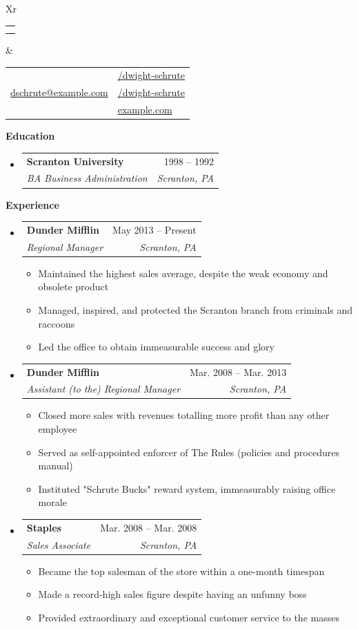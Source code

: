 \documentclass[letterpaper,12pt]{article}
\makeatletter
\def \fullname {Dwight Schrute}
\def \subtitle {}
\def \linkedinicon {\faLinkedin}
\def \linkedinlink {https://example.com/linkedin}
\def \linkedintext {/dwight-schrute}
\def \phoneicon {\faPhone}
\def \phonetext {+1-123-456-7890}
\def \emailicon {\faEnvelope}
\def \emaillink {mailto:dschrute@example.com}
\def \emailtext {dschrute@example.com}
\def \githubicon {\faGithub}
\def \githublink {https://example.com/github}
\def \githubtext {/dwight-schrute}
\def \websiteicon {\faGlobe}
\def \websitelink {https://example.com}
\def \websitetext {example.com}
\def \headertype {\doublecol} %
\def \entryspacing {-0pt}
\def \linkedin {\linkedinicon \hspace{3pt}\href{\linkedinlink}{\linkedintext}}
\def \phone {\phoneicon \hspace{3pt}{ \phonetext}}
\def \email {\emailicon \hspace{3pt}\href{\emaillink}{\emailtext}}
\def \github {\githubicon \hspace{3pt}\href{\githublink}{\githubtext}}
\def \website {\websiteicon \hspace{3pt}\href{\websitelink}{\websitetext}}
\renewcommand{\section}[2]{\vspace{5pt}
  \colorbox{secondary}{\color{white}\raggedbottom\normalsize\textbf{{#1}{\hspace{7pt}#2}}}
}
\newcommand{\resumeEntryStart}{\begin{itemize}[leftmargin=2.5mm]}
\newcommand{\resumeEntryEnd}{\end{itemize}\vspace{\entryspacing}}
\newcommand{\resumeItemListStart}{\begin{itemize}[leftmargin=4.5mm]}
\newcommand{\resumeItemListEnd}{\end{itemize}}
\newcommand{\resumeItem}[1]{
  \item\small{
    {#1 \vspace{-2pt}}
  }
}
\newcommand{\resumeEntryTSDL}[4]{
  \vspace{-1pt}\item[]
    \begin{tabularx}{0.97\textwidth}{X@{\hspace{60pt}}r}
      \textbf{\color{primary}#1} & {\firabook\color{accent}\small#2} \\
      \textit{\color{accent}\small#3} & \textit{\color{accent}\small#4} \\
    \end{tabularx}\vspace{-6pt}
}
\newcommand{\doublecol}[6]{
  \begin{tabularx}{\textwidth}{Xr}
    {
      \begin{tabular}[c]{l}
        \fontsize{35}{45}\selectfont{\color{primary}{{\textbf{\fullname}}}} \\
        {\textit{\subtitle}} %
      \end{tabular}
    } & {
      \begin{tabular}[c]{l@{\hspace{1.5em}}l}
        {\small#4} & {\small#1} \\
        {\small#5} & {\small#2} \\
        {\small#6} & {\small#3}
      \end{tabular}
    }
  \end{tabularx}
}
\newcommand{\singlecol}[6]{
  \begin{tabularx}{\textwidth}{Xr}
    {
      \begin{tabular}[b]{l}
        \fontsize{35}{45}\selectfont{\color{primary}{{\textbf{\fullname}}}} \\
        {\textit{\subtitle}} %
      \end{tabular}
    } & {
      \begin{tabular}[c]{l}
        {\small#1} \\
        {\small#2} \\
        {\small#3} \\
        {\small#4} \\
        {\small#5} \\
        {\small#6}
      \end{tabular}
    }
  \end{tabularx}
}
\makeatother
\begin{document}


\headertype{\linkedin}{\github}{\website}{\phone}{\email}{} %
\vspace{-10pt} %

\section{\faGraduationCap}{Education}

  \resumeEntryStart
    \resumeEntryTSDL
      {Scranton University}{1998 -- 1992}
      {BA Business Administration}{Scranton, PA}
  \resumeEntryEnd

\section{\faPieChart}{Experience}

  \resumeEntryStart
    \resumeEntryTSDL
      {Dunder Mifflin}{May 2013 -- Present}
      {Regional Manager}{Scranton, PA}
    \resumeItemListStart
      \resumeItem {Maintained the highest sales average, despite the weak economy and obsolete product}
      \resumeItem {Managed, inspired, and protected the Scranton branch from criminals and raccoons}
      \resumeItem {Led the office to obtain immeasurable success and glory}
    \resumeItemListEnd
  \resumeEntryEnd

  \resumeEntryStart
    \resumeEntryTSDL
      {Dunder Mifflin}{Mar. 2008 -- Mar. 2013}
      {Assistant (to the) Regional Manager}{Scranton, PA}
    \resumeItemListStart
      \resumeItem {Closed more sales with revenues totalling more profit than any other employee}
      \resumeItem {Served as self-appointed enforcer of The Rules (policies and procedures manual)}
      \resumeItem {Instituted "Schrute Bucks" reward system, immeasurably raising office morale}
    \resumeItemListEnd
  \resumeEntryEnd

  \resumeEntryStart
    \resumeEntryTSDL
      {Staples}{Mar. 2008 -- Mar. 2008}
      {Sales Associate}{Scranton, PA}
    \resumeItemListStart
        \resumeItem {Became the top salesman of the store within a one-month timespan}
        \resumeItem {Made a record-high sales figure despite having an unfunny boss}
        \resumeItem {Provided extraordinary and exceptional customer service to the masses}
    \resumeItemListEnd
  \resumeEntryEnd
\end{document}
